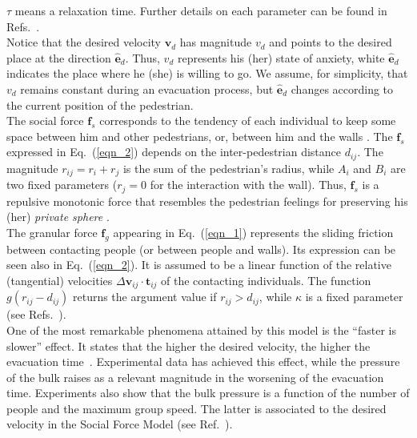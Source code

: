 $\tau$ means a relaxation time. Further details on each parameter can be found 
in Refs.~\cite{Helbing1,Dorso1,Dorso2,Dorso3,Dorso4}.\\

Notice that the desired velocity $\mathbf{v}_d$ has magnitude $v_d$ and points 
to the desired place at the direction $\hat{\mathbf{e}}_d$. Thus, $v_d$ 
represents his (her) state of anxiety, white $\hat{\mathbf{e}}_d$ indicates the 
place where he (she) is willing to go. We assume, for simplicity, that 
$v_d$ remains constant during an evacuation process, but $\hat{\mathbf{e}}_d$ 
changes according to the current position of the pedestrian.   \\

The social force $\mathbf{f}_s$ corresponds to the tendency of each individual 
to keep some space between him and other pedestrians, or, between him and the 
walls \cite{Helbing4}. The $\mathbf{f}_s$ expressed in Eq.~(\ref{eqn_2}) 
depends on the inter-pedestrian distance $d_{ij}$. The magnitude 
$r_{ij}=r_i+r_j$ is the sum of the pedestrian's radius, while $A_i$ and $B_i$ 
are two fixed parameters ($r_j=0$ for the interaction with the wall). Thus, 
$\mathbf{f}_s$ is a repulsive monotonic force that resembles the pedestrian 
feelings for preserving his (her) \textit{private sphere} 
\cite{Helbing1,Helbing4}. \\

The granular force $\mathbf{f}_g$ appearing in Eq.~(\ref{eqn_1}) represents the 
sliding friction between contacting people (or between people  and walls). Its 
expression can be seen also in Eq.~(\ref{eqn_2}). It is assumed to be a linear 
function of the relative (tangential) velocities $\Delta
\mathbf{v}_{ij}\cdot\mathbf{t}_{ij}$ of the contacting individuals. The 
function $g(r_{ij}-d_{ij})$ returns the argument value if $r_{ij}>d_{ij}$, 
while $\kappa$ is a fixed parameter (see 
Refs.~\cite{Helbing1,Dorso1,Dorso2,Dorso3,Dorso4}).\\

One of the most remarkable phenomena attained by this model is the ``faster is slower'' effect. It states that the higher the desired velocity, the higher the evacuation time~\cite{Helbing1}. Experimental data has achieved this effect, while the pressure of the bulk raises as a relevant magnitude in the worsening of the evacuation time. Experiments also show that the bulk pressure is a function of the number  of people and the maximum group speed. The latter is associated to the desired velocity in the Social Force Model (see Ref.~\cite{Pastor}).  
 


